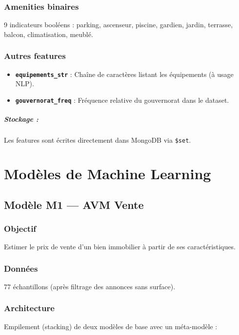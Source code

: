 \documentclass[12pt,a4paper]{report}
\begin{document}
\subsection{Amenities binaires}
9 indicateurs booléens : parking, ascenseur, piscine, gardien, jardin, terrasse, balcon, climatisation, meublé.

\subsection{Autres features}
\begin{itemize}
    \item \texttt{\textbf{equipements\_str}} : Chaîne de caractères listant les équipements (à usage NLP).
    \item \texttt{\textbf{gouvernorat\_freq}} : Fréquence relative du gouvernorat dans le dataset.
\end{itemize}

\paragraph{Stockage :} Les features sont écrites directement dans MongoDB via \texttt{\$set}.

\chapter{Modèles de Machine Learning}

\section{Modèle M1 — AVM Vente}

\subsection{Objectif}
Estimer le prix de vente d'un bien immobilier à partir de ses caractéristiques.

\subsection{Données}
77 échantillons (après filtrage des annonces sans surface).

\subsection{Architecture}
Empilement (stacking) de deux modèles de base avec un méta-modèle :
\end{document}
